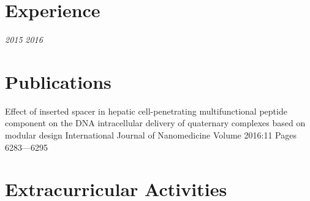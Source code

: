 

\section{Experience}

{
	\textit{2015}
	\textit{2016}
}

\section{Publications}


\publicationgroup
{Effect of inserted spacer in hepatic cell-penetrating multifunctional peptide component on the DNA intracellular delivery of quaternary complexes based on modular design}
{ International Journal of Nanomedicine Volume 2016:11 Pages 6283—6295  }






\section{Extracurricular Activities}


